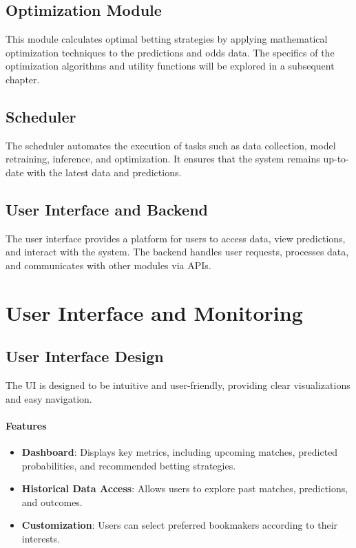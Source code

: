 \subsection{Optimization Module}

This module calculates optimal betting strategies by applying mathematical optimization techniques to the predictions and odds data. The specifics of the optimization algorithms and utility functions will be explored in a subsequent chapter.

\subsection{Scheduler}

The scheduler automates the execution of tasks such as data collection, model retraining, inference, and optimization. It ensures that the system remains up-to-date with the latest data and predictions.

\subsection{User Interface and Backend}

The user interface provides a platform for users to access data, view predictions, and interact with the system. The backend handles user requests, processes data, and communicates with other modules via APIs.

\section{User Interface and Monitoring}

\subsection{User Interface Design}

The UI is designed to be intuitive and user-friendly, providing clear visualizations and easy navigation.

\paragraph{Features}

\begin{itemize}
    \item \textbf{Dashboard}: Displays key metrics, including upcoming matches, predicted probabilities, and recommended betting strategies.
    \item \textbf{Historical Data Access}: Allows users to explore past matches, predictions, and outcomes.
    \item \textbf{Customization}: Users can select preferred bookmakers according to their interests.
\end{itemize}

